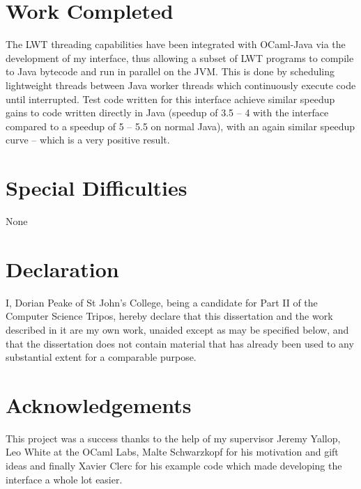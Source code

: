 \documentclass[12pt,twoside,notitlepage]{report}
\begin{document}
\section*{Work Completed}
The LWT threading capabilities have been integrated with OCaml-Java via the development of my interface, thus allowing a subset of LWT programs to compile to Java bytecode and run in parallel on the JVM. This is done by scheduling
lightweight threads between Java worker threads which continuously execute code until interrupted. Test code written for this interface achieve similar speedup gains to code written directly in Java (speedup of 3.5 -- 4 with the
interface compared to a speedup of 5 -- 5.5 on normal Java), with an again similar speedup curve -- which is a very positive result. 

\section*{Special Difficulties}
None

\newpage
\section*{Declaration}

I, Dorian Peake of St John's College, being a candidate for Part II of the Computer
Science Tripos, hereby declare
that this dissertation and the work described in it are my own work,
unaided except as may be specified below, and that the dissertation
does not contain material that has already been used to any substantial
extent for a comparable purpose.

\bigskip
{}

\medskip
{}

\cleardoublepage

\tableofcontents

\listoffigures

\newpage
\section*{Acknowledgements}
This project was a success thanks to the help of my supervisor Jeremy Yallop, Leo White at the OCaml Labs, Malte Schwarzkopf for his motivation and gift ideas and finally Xavier Clerc for his example code which made developing the
interface a whole lot easier.
\end{document}
